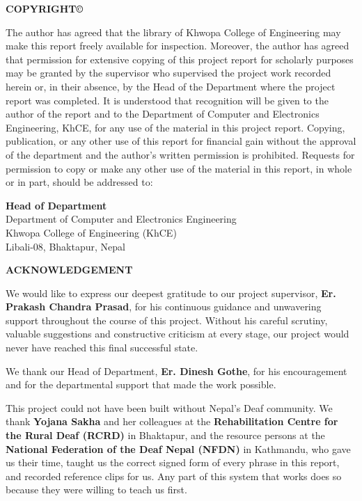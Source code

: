 \begin{center}
    {\Large\bfseries COPYRIGHT\copyright}
\end{center}
\vspace{1em}
\normalsize
The author has agreed that the library of Khwopa College of Engineering may make this report freely available for inspection. Moreover, the author has agreed that permission for extensive copying of this project report for scholarly purposes may be granted by the supervisor who supervised the project work recorded herein or, in their absence, by the Head of the Department where the project report was completed. It is understood that recognition will be given to the author of the report and to the Department of Computer and Electronics Engineering, KhCE, for any use of the material in this project report. Copying, publication, or any other use of this report for financial gain without the approval of the department and the author's written permission is prohibited. Requests for permission to copy or make any other use of the material in this report, in whole or in part, should be addressed to:

\vspace{1.5cm}
\noindent\textbf{Head of Department} \\
Department of Computer and Electronics Engineering \\
Khwopa College of Engineering (KhCE) \\
Libali-08, Bhaktapur, Nepal
\newpage

\begin{center}
    {\Large\bfseries ACKNOWLEDGEMENT}
\end{center}
\vspace{1.2cm}
\normalsize
\noindent
We would like to express our deepest gratitude to our project supervisor, \textbf{Er. Prakash Chandra Prasad}, for his continuous guidance and unwavering support throughout the course of this project. Without his careful scrutiny, valuable suggestions and constructive criticism at every stage, our project would never have reached this final successful state.

\noindent We thank our Head of Department, \textbf{Er. Dinesh Gothe}, for his encouragement and for the departmental support that made the work possible.

\noindent This project could not have been built without Nepal's Deaf community. We thank \textbf{Yojana Sakha} and her colleagues at the \textbf{Rehabilitation Centre for the Rural Deaf (RCRD)} in Bhaktapur, and the resource persons at the \textbf{National Federation of the Deaf Nepal (NFDN)} in Kathmandu, who gave us their time, taught us the correct signed form of every phrase in this report, and recorded reference clips for us. Any part of this system that works does so because they were willing to teach us first.

